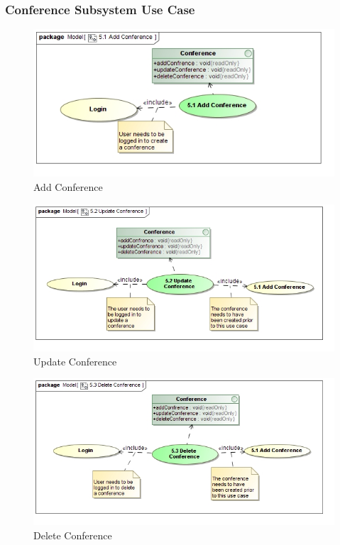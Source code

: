 \documentclass{article}
\begin{document}
			\subsubsection{Conference Subsystem Use Case}
				\begin{figure}
					\includegraphics[width=\textwidth]{5.3-SS5-7/Add-Conference}
					\caption{Add Conference}
				\end{figure}
				\begin{figure}
					\includegraphics[width=\textwidth]{5.3-SS5-7/Update-Conference}
					\caption{Update Conference}
				\end{figure}
				\begin{figure}
					\includegraphics[width=\textwidth]{5.3-SS5-7/Delete-Conference}
					\caption{Delete Conference}
				\end{figure}
\end{document}
